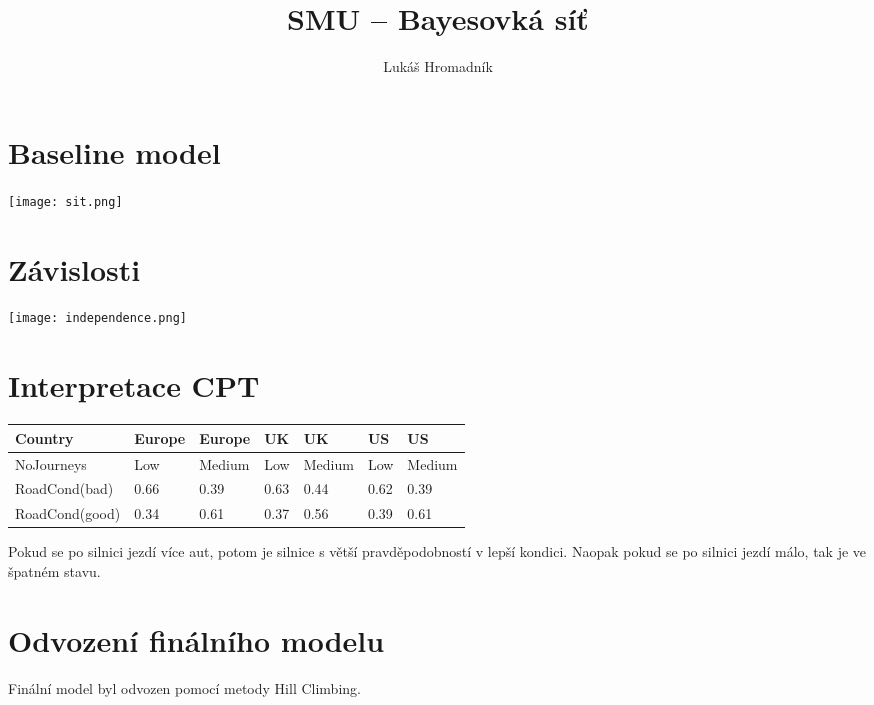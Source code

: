 \title{SMU – Bayesovká síť}
\author{Lukáš Hromadník}
\maketitle

\section{Baseline model}

\texttt{[image: sit.png]}

\section{Závislosti}

\texttt{[image: independence.png]}

\section{Interpretace CPT}

\begin{tabular}{| l | l | l | l | l | l | l |}
\hline
Country & Europe & Europe & UK & UK & US & US \\ \hline
NoJourneys & Low & Medium & Low & Medium & Low & Medium \\ \hline
RoadCond(bad) & 0.66 & 0.39 & 0.63 & 0.44 & 0.62 & 0.39 \\ \hline
RoadCond(good) & 0.34 & 0.61 & 0.37 & 0.56 & 0.39 & 0.61 \\ \hline
\end{tabular}

Pokud se po silnici jezdí více aut, potom je silnice s větší pravděpodobností v lepší kondici. Naopak pokud se po silnici jezdí málo, tak je ve špatném stavu.

\section{Odvození finálního modelu}

Finální model byl odvozen pomocí metody Hill Climbing.